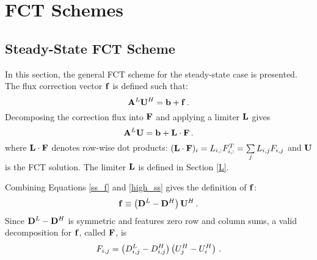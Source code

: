 \section{FCT Schemes}
\subsection{Steady-State FCT Scheme}
In this section, the general FCT scheme for the steady-state case is presented.
The flux correction vector $\mathbf{f}$ is defined such that:
\begin{equation}\label{ss_f}
   \mathbf{A}^L\mathbf{U}^H = \mathbf{b} + \mathbf{f} \,.
\end{equation}
Decomposing the correction flux into $\mathbf{F}$ and applying a limiter
$\mathbf{L}$ gives
\begin{equation}\label{FCT_limited_ss}
   \mathbf{A}^L\mathbf{U} = \mathbf{b} + \mathbf{L}\cdot\mathbf{F} \,.
\end{equation}
where $\mathbf{L}\cdot\mathbf{F}$ denotes row-wise dot products: $(\mathbf{L}\cdot\mathbf{F})_i = L_{i,:}F_{i,:}^T
= \sum\limits_j L_{i,j} F_{i,j}$ and $\mathbf{U}$ is the FCT solution.  The limiter $\mathbf{L}$ is
defined in Section \ref{L}.

Combining Equations \eqref{ss_f} and \eqref{high_ss}
gives the definition of $\mathbf{f}$:
\begin{equation}
   \mathbf{f} \equiv \left(\mathbf{D}^L-\mathbf{D}^H\right)\mathbf{U}^H \,.
\end{equation}
Since $\mathbf{D}^L-\mathbf{D}^H$ is symmetric
and features zero row and column sums, a valid decomposition for $\mathbf{f}$,
called $\mathbf{F}$, is
\begin{equation}
   F_{i,j} = \left(D_{i,j}^L-D_{i,j}^H\right)\left(U_j^H - U_i^H\right) \,.
\end{equation}
